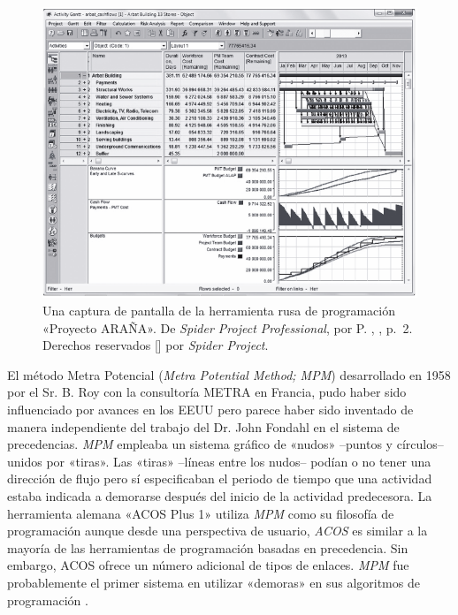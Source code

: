 \documentclass[spanish,draft,12pt,headsepline,footsepline,paper=letter]{scrreprt}
\begin{document}
\begin{figure}
\includegraphics[width=\textwidth]{media/spider_project_gray.pdf}
\caption[Interfaz del Proyecto ARAÑA]{Una captura de pantalla de la herramienta rusa de programación «Proyecto ARAÑA». De \textit{Spider Project Professional}, por P. \citeauthor{cotterell14spider-project}, \citeyear{cotterell14spider-project}, p.~2. Derechos reservados [\citeyear{cotterell14spider-project}] por \textit{Spider Project}.}
\label{fig:screenshot_project_spider}
\end{figure}

El método Metra Potencial (\textit{Metra Potential Method; MPM}) desarrollado en 1958 por el Sr. B. Roy con la consultoría METRA en Francia, pudo haber sido influenciado por avances en los EEUU pero parece haber sido inventado de manera independiente del trabajo del Dr. John Fondahl en el sistema de precedencias. \textit{MPM} empleaba un sistema gráfico de «nudos» –puntos y círculos– unidos por «tiras». Las «tiras» –líneas entre los nudos– podían o no tener una dirección de flujo pero sí especificaban el periodo de tiempo que una actividad estaba indicada a demorarse después del inicio de la actividad predecesora. La herramienta alemana «ACOS Plus 1» utiliza \textit{MPM} como su filosofía de programación aunque desde una perspectiva de usuario, \textit{ACOS} es similar a la mayoría de las herramientas de programación basadas en precedencia. Sin embargo, ACOS ofrece un número adicional de tipos de enlaces. \textit{MPM} fue probablemente el primer sistema en utilizar «demoras» en sus algoritmos de programación \citep[p.~8,~9]{Weaver2006}.
\end{document}
